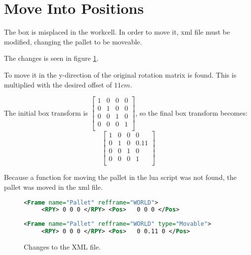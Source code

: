 \section{Move Into Positions}

The box is misplaced in the workcell.
In order to move it, xml file must be modified, changing the pallet to be moveable.

The changes is seen in figure \ref{fig:commit_xml}.

To move it in the y-direction of the original rotation matrix is found.
This is multiplied with the desired offset of $11 cm$.

The initial box transform is 
\( 
\left[
 \begin{array}{ccc|c}
  1 & 0 & 0 & 0\\
  0 & 1 & 0 & 0\\
  0 & 0 & 1 & 0\\ \hline
  0 & 0 & 0 & 1\\
 \end{array}
\right]
\), so the final box transform becomes: 
\begin{equation}
\left[
 \begin{array}{ccc|c}
  1 & 0 & 0 & 0\\
  0 & 1 & 0 & 0.11\\
  0 & 0 & 1 & 0\\ \hline
  0 & 0 & 0 & 1\\
 \end{array}
\right]
\end{equation}

Because a function for moving the pallet in the lua script was not found, the pallet was moved in the xml file.

\begin{figure}[h]
 \centering
\begin{lstlisting}[backgroundcolor=\color{commit_remove},language=xml]
<Frame name="Pallet" refframe="WORLD">
     <RPY> 0 0 0 </RPY> <Pos>   0 0 0 </Pos>
\end{lstlisting}
\begin{lstlisting}[backgroundcolor=\color{commit_add},language=xml]
<Frame name="Pallet" refframe="WORLD" type="Movable"> 
     <RPY> 0 0 0 </RPY> <Pos>   0 0.11 0 </Pos>
\end{lstlisting}
\caption{Changes to the XML file. }
\label{fig:commit_xml}
\end{figure}

